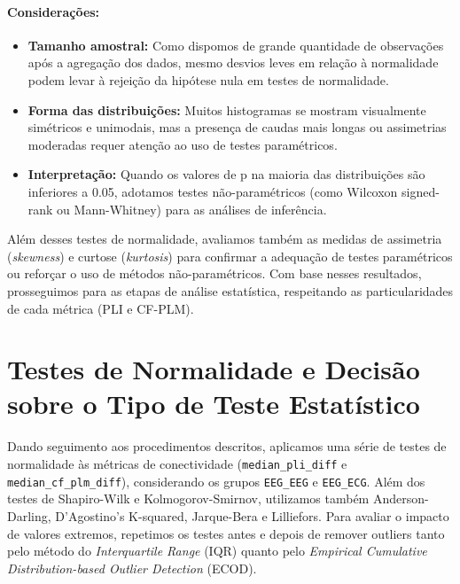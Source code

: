 \paragraph{Considerações:}
\begin{itemize}
    \item \textbf{Tamanho amostral:} Como dispomos de grande quantidade de observações após a agregação dos dados, mesmo desvios leves em relação à normalidade podem levar à rejeição da hipótese nula em testes de normalidade.
    \item \textbf{Forma das distribuições:} Muitos histogramas se mostram visualmente simétricos e unimodais, mas a presença de caudas mais longas ou assimetrias moderadas requer atenção ao uso de testes paramétricos.
    \item \textbf{Interpretação:} Quando os valores de p na maioria das distribuições são inferiores a 0.05, adotamos testes não-paramétricos (como Wilcoxon signed-rank ou Mann-Whitney) para as análises de inferência.
\end{itemize}

Além desses testes de normalidade, avaliamos também as medidas de assimetria (\emph{skewness}) e curtose (\emph{kurtosis}) para confirmar a adequação de testes paramétricos ou reforçar o uso de métodos não-paramétricos. Com base nesses resultados, prosseguimos para as etapas de análise estatística, respeitando as particularidades de cada métrica (PLI e CF-PLM).

\section{Testes de Normalidade e Decisão sobre o Tipo de Teste Estatístico}

Dando seguimento aos procedimentos descritos, aplicamos uma série de testes de normalidade às métricas de conectividade (\texttt{median\_pli\_diff} e \texttt{median\_cf\_plm\_diff}), considerando os grupos \texttt{EEG\_EEG} e \texttt{EEG\_ECG}. Além dos testes de Shapiro-Wilk e Kolmogorov-Smirnov, utilizamos também Anderson-Darling, D'Agostino's K-squared, Jarque-Bera e Lilliefors. Para avaliar o impacto de valores extremos, repetimos os testes antes e depois de remover outliers tanto pelo método do \emph{Interquartile Range} (IQR) quanto pelo \emph{Empirical Cumulative Distribution-based Outlier Detection} (ECOD).

